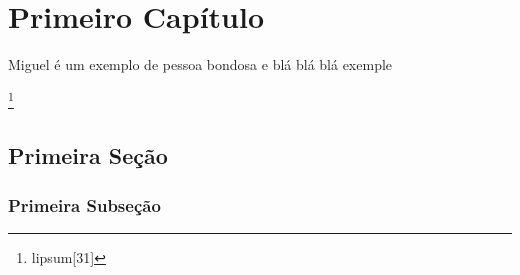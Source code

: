 \documentclass[
	12pt,				%
	openright,			%
	oneside,			%
	a4paper,			%
	english,			%
	french,				%
	spanish,			%
	brazil,sumario=tradicional				%
	]{UFPE-DCP} %
\makeatletter
\newlength\interepigraphskip
\renewcommand\epigraph[3][\interepigraphskip]{\vspace{\beforeepigraphskip}
  {\epigraphsize\begin{\epigraphflush}\begin{minipage}{\epigraphwidth}
    \@epitext{#2}\\[#1] \@episource{#3}
    \end{minipage}\end{\epigraphflush}
    \vspace{\afterepigraphskip}}}
\makeatother
\begin{document}

\chapter{Primeiro Capítulo}
\thispagestyle{capitulo}
\OnehalfSpacing %



Miguel é um exemplo de pessoa bondosa e blá blá blá exemple \lipsum[2]
\lipsum[31]

\lipsum[31]

\lipsum[31]

\lipsum[31]

\lipsum[31]
\pagestyle{texto}
\lipsum[31]

\lipsum[31]\footnote{lipsum[31]}

\lipsum[31]

\lipsum[31]
\section{Primeira Seção} 

\lipsum[31]

\lipsum[31]

\lipsum[31]

\lipsum[31]

\lipsum[31]

\subsection{Primeira Subseção}
\end{document}
